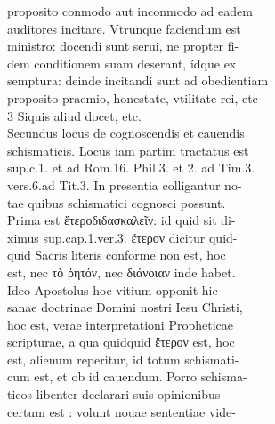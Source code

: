 \documentclass{article}
\begin{document}
\begin{pages}
                proposito conmodo aut inconmodo ad eadem \\
                auditores incitare. Vtrunque faciendum est \\
                ministro: docendi sunt serui, ne propter fi- \\
                dem conditionem suam deserant, ídque ex \\
                semptura: deinde incitandi sunt ad obedientiam \\
                proposito praemio, honestate, vtilitate rei, etc \\
                3 Siquis aliud docet, etc. \\
                Secundus locus de cognoscendis et cauendis \\
                schismaticis. Locus iam partim tractatus est \\
                sup.c.1. et ad Rom.16. Phil.3. et 2. ad Tim.3. \\
                vers.6.ad Tit.3. In presentia colligantur no- \\
                tae quibus schismatici cognosci possunt. \\
                Prima est ἔτεροδιδασκαλεῖν: id quid sit di- \\
                ximus sup.cap.1.ver.3. ἕτερον dicitur quid- \\
                quid Sacris literis conforme non est, hoc \\
                est, nec τὸ ῥητόν, nec διάνοιαν inde habet. \\
                Ideo Apostolus hoc vitium opponit hic \\
                sanae doctrinae Domini nostri Iesu Christi, \\
                hoc est, verae interpretationi Propheticae \\
                scripturae, a qua quidquid ἕτερον est, hoc \\
                est, alienum reperitur, id totum schismati- \\
                cum est, et ob id cauendum. Porro schisma- \\
                ticos libenter declarari suis opinionibus \\
                certum est : volunt nouae sententiae vide- \\

\end{pages}
\end{document}
